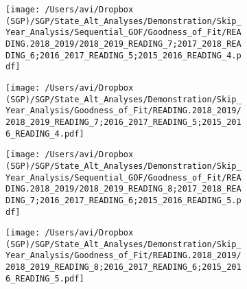 \documentclass[12pt]{article}
\begin{document}
\begin{figure}[H]
\caption*{{{\bf{Figure A6:}} } Sequential (left) and skip-year (right) fit plots for Reading (grades 7 - 8)}
  \begin{subfigure}[b]{0.5\textwidth}
    \texttt{[image: /Users/avi/Dropbox (SGP)/SGP/State\_Alt\_Analyses/Demonstration/Skip\_Year\_Analysis/Sequential\_GOF/Goodness\_of\_Fit/READING.2018\_2019/2018\_2019\_READING\_7;2017\_2018\_READING\_6;2016\_2017\_READING\_5;2015\_2016\_READING\_4.pdf]}
  \end{subfigure}
  \begin{subfigure}[b]{0.5\textwidth}
    \texttt{[image: /Users/avi/Dropbox (SGP)/SGP/State\_Alt\_Analyses/Demonstration/Skip\_Year\_Analysis/Goodness\_of\_Fit/READING.2018\_2019/2018\_2019\_READING\_7;2016\_2017\_READING\_5;2015\_2016\_READING\_4.pdf]}
  \end{subfigure}
  \begin{subfigure}[b]{0.5\textwidth}
    \texttt{[image: /Users/avi/Dropbox (SGP)/SGP/State\_Alt\_Analyses/Demonstration/Skip\_Year\_Analysis/Sequential\_GOF/Goodness\_of\_Fit/READING.2018\_2019/2018\_2019\_READING\_8;2017\_2018\_READING\_7;2016\_2017\_READING\_6;2015\_2016\_READING\_5.pdf]}
  \end{subfigure}
  \begin{subfigure}[b]{0.5\textwidth}
    \texttt{[image: /Users/avi/Dropbox (SGP)/SGP/State\_Alt\_Analyses/Demonstration/Skip\_Year\_Analysis/Goodness\_of\_Fit/READING.2018\_2019/2018\_2019\_READING\_8;2016\_2017\_READING\_6;2015\_2016\_READING\_5.pdf]}
  \end{subfigure}
\end{figure}
\end{document}
